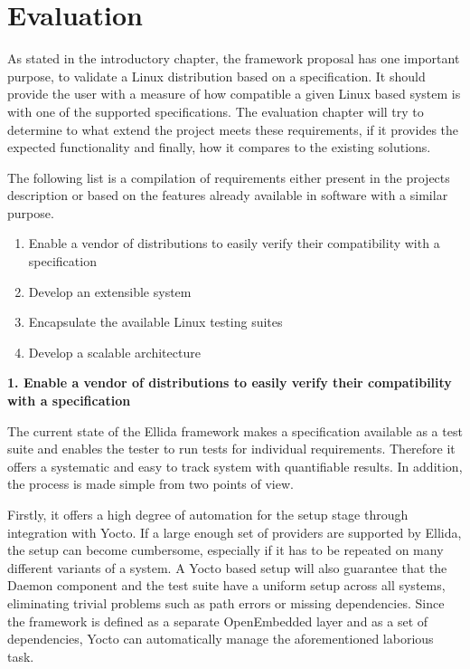 \chapter{Evaluation}

As stated in the introductory chapter, the framework proposal has one important purpose, to validate a Linux distribution based on a specification. It should provide the user with a measure of how compatible a given Linux based system is with one of the supported specifications. The evaluation chapter will try to determine to what extend the project meets these requirements, if it provides the expected functionality and finally, how it compares to the existing solutions.

The following list is a compilation of requirements either present in the projects description or based on the features already available in software with a similar purpose.

\begin{enumerate}
\item Enable a vendor of distributions to easily verify their compatibility with a specification
\item Develop an extensible system
\item Encapsulate the available Linux testing suites
\item Develop a scalable architecture
\end{enumerate}


\textbf{1. Enable a vendor of distributions to easily verify their compatibility with a specification}

The current state of the Ellida framework makes a specification available as a test suite and enables the tester to run tests for individual requirements. Therefore it offers a systematic and easy to track system with quantifiable results. In addition, the process is made simple from two points of view.

Firstly, it offers a high degree of automation for the setup stage through integration with Yocto. If a large enough set of providers are supported by Ellida, the setup can become cumbersome, especially if it has to be repeated on many different variants of a system. A Yocto based setup will also guarantee that the Daemon component and the test suite have a uniform setup across all systems, eliminating trivial problems such as path errors or missing dependencies. Since the framework is defined as a separate OpenEmbedded layer and as a set of dependencies, Yocto can automatically manage the aforementioned laborious task.

